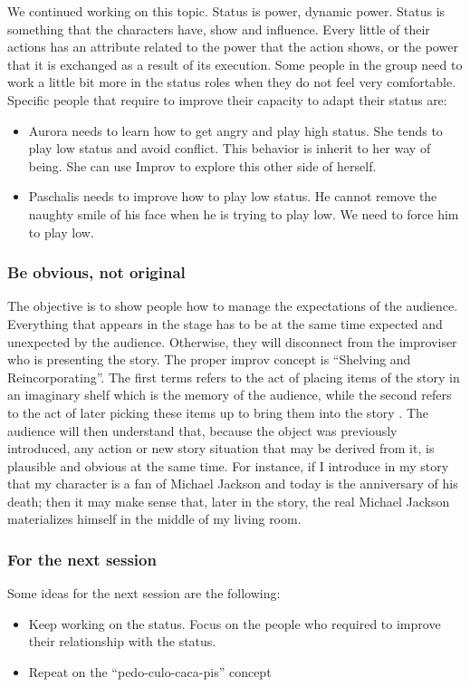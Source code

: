 \documentclass[11pt,a4paper,fleqn,twoside]{article}
\begin{document}
We continued working on this topic. Status is power, dynamic power. Status is something that the characters have, show and influence. Every little of their actions has an attribute related to the power that the action shows, or the power that it is exchanged as a result of its execution. Some people in the group need to work a little bit more in the status roles when they do not feel very comfortable. Specific people that require to improve their capacity to adapt their status are:
%
\begin{itemize}
  \item Aurora needs to learn how to get angry and play high status. She tends to play low status and avoid conflict. This behavior is inherit to her way of being. She can use Improv to explore this other side of herself. 
  \item Paschalis needs to improve how to play low status. He cannot remove the naughty smile of his face when he is trying to play low. We need to force him to play low.
\end{itemize}

\subsubsection{Be obvious, not original}

The objective is to show people how to manage the expectations of the audience. Everything that appears in the stage has to be at the same time expected and unexpected by the audience. Otherwise, they will disconnect from the improviser who is presenting the story. The proper improv concept is ``Shelving and Reincorporating''. The first terms refers to the act of placing items of the story in an imaginary shelf which is the memory of the audience, while the second refers to the act of later picking these items up to bring them into the story . The audience will then understand that, because the object was previously introduced, any action or new story situation that may be derived from it, is plausible and obvious at the same time. For instance, if I introduce in my story that my character is a fan of Michael Jackson and today is the anniversary of his death; then it may make sense that, later in the story, the real Michael Jackson materializes himself in the middle of my living room. 

\subsubsection{For the next session}

\noindent
Some ideas for the next session are the following:

\begin{itemize}
  \item Keep working on the status. Focus on the people who required to improve their relationship with the status.
  \item Repeat on the ``pedo-culo-caca-pis'' concept
\end{itemize}
\end{document}
